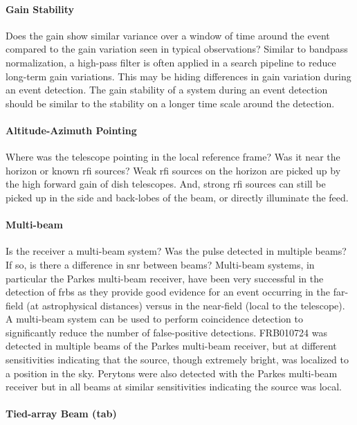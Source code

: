\documentclass[a4paper,fleqn,usenatbib]{mnras}
\begin{document}
\paragraph{Gain Stability}

Does the gain show similar variance over a window of time around the event
compared to the gain variation seen in typical observations? Similar to bandpass
normalization, a high-pass filter is often applied in a search pipeline to
reduce long-term gain variations. This may be hiding differences in gain
variation during an event detection. The gain stability of a system during an
event detection should be similar to the stability on a longer time scale around
the detection.

\paragraph{Altitude-Azimuth Pointing}

Where was the telescope pointing in the local reference frame? Was it near the
horizon or known \gls{rfi} sources? Weak \gls{rfi} sources on the horizon are
picked up by the high forward gain of dish telescopes. And, strong \gls{rfi}
sources can still be picked up in the side and back-lobes of the beam, or
directly illuminate the feed.

\paragraph{Multi-beam}

Is the receiver a multi-beam system? Was the pulse detected in multiple beams?
If so, is there a difference in \gls{snr} between beams?  Multi-beam systems, in
particular the Parkes multi-beam receiver, have been very successful in the
detection of \glspl{frb} as they provide good evidence for an event occurring in
the far-field (at astrophysical distances) versus in the near-field (local to
the telescope).  A multi-beam system can be used to perform coincidence
detection to significantly reduce the number of false-positive detections.
FRB010724 \citep{2007Sci...318..777L} was detected in multiple beams of the
Parkes multi-beam receiver, but at different sensitivities indicating that the
source, though extremely bright, was localized to a position in the sky.
Perytons were also detected with the Parkes multi-beam receiver but in all beams
at similar sensitivities indicating the source was local.

\paragraph{Tied-array Beam (\gls{tab})}
\end{document}
